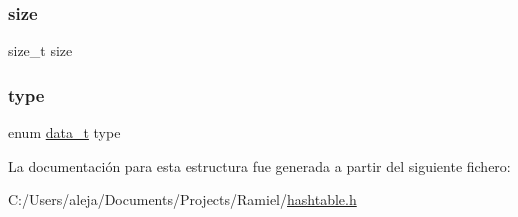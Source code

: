 \mbox{\label{structht__item_a854352f53b148adc24983a58a1866d66}} 
\subsubsection{\texorpdfstring{size}{size}}
{\footnotesize\ttfamily size\+\_\+t size}

\mbox{\label{structht__item_a0c6169f5c94682132bbbe974784559e6}} 
\subsubsection{\texorpdfstring{type}{type}}
{\footnotesize\ttfamily enum \mbox{\hyperlink{hashtable_8h_adb5f3584b941a8dc0fed6b7302b4b8eb}{data\+\_\+t}} type}



La documentación para esta estructura fue generada a partir del siguiente fichero\+:\begin{DoxyCompactItemize}
\item 
C\+:/\+Users/aleja/\+Documents/\+Projects/\+Ramiel/\mbox{\hyperlink{hashtable_8h}{hashtable.\+h}}\end{DoxyCompactItemize}
